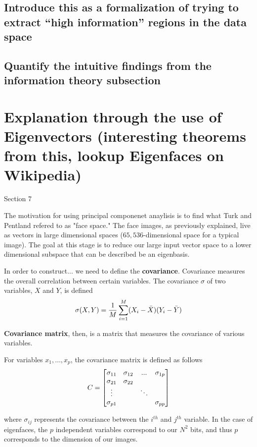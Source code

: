 \documentclass[12pt]{extarticle}
\begin{document}
    \subsection{Introduce this as a formalization of trying to extract ``high information'' regions in the data space}
    \blindtext
    \subsection{Quantify the intuitive findings from the information theory subsection}
    \blindtext
    
    \section{Explanation through the use of Eigenvectors (interesting theorems from this, lookup Eigenfaces on Wikipedia)}
        Section 7
        
        The motivation for using principal componenet anaylisis is to find what Turk and Pentland refered to as "face space." The face images, as previously explained, live as vectors in large dimensional spaces ($65,536$-dimensional space for a typical image). The goal at this stage is to reduce our large input vector space to a lower dimensional subspace that can be described be an eigenbasis. 
        
        In order to construct... we need to define the \textbf{covariance}. Covariance measures the overall correlation between certain variables. The covariance $\sigma$ of two variables, $X$ and $Y$, is defined
            \[\sigma(X,Y) = \frac{1}{M} \sum _{i=1}^{M} (X_i-\bar{X}) (Y_i-\bar{Y})\]
        
        \textbf{Covariance matrix}, then, is a matrix that measures the covariance of various variables.
        
        For variables $x_1,\ldots,x_p$, the covariance matrix is defined as follows
        \[
            C = \begin{bmatrix}
                \sigma_{11} & \sigma_{12} & ... & \sigma_{1p} \\
                \sigma_{21} & \sigma_{22} &  & \\
                \vdots  &  & \ddots  & \\
                \sigma_{p1} &  &  & \sigma _{pp}
            \end{bmatrix}
        \]
        
        where $\sigma_{ij}$ represents the covariance between the $i^{th}$ and $j^{th}$ variable. In the case of eigenfaces, the $p$ independent variables correspond to our $N^{2}$ bits, and thus $p$ corresponds to the dimension of our images. 
\end{document}
